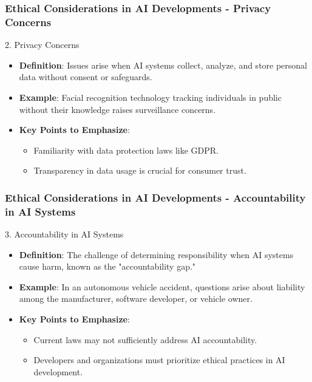 \documentclass[aspectratio=169]{beamer}
\begin{document}
\begin{frame}[fragile]
    \frametitle{Ethical Considerations in AI Developments - Privacy Concerns}
    
    \begin{block}{2. Privacy Concerns}
        \begin{itemize}
            \item \textbf{Definition}: Issues arise when AI systems collect, analyze, and store personal data without consent or safeguards.
            \item \textbf{Example}: Facial recognition technology tracking individuals in public without their knowledge raises surveillance concerns.
            \item \textbf{Key Points to Emphasize}:
            \begin{itemize}
                \item Familiarity with data protection laws like GDPR.
                \item Transparency in data usage is crucial for consumer trust.
            \end{itemize}
        \end{itemize}
    \end{block}
\end{frame}

\begin{frame}[fragile]
    \frametitle{Ethical Considerations in AI Developments - Accountability in AI Systems}
    
    \begin{block}{3. Accountability in AI Systems}
        \begin{itemize}
            \item \textbf{Definition}: The challenge of determining responsibility when AI systems cause harm, known as the "accountability gap."
            \item \textbf{Example}: In an autonomous vehicle accident, questions arise about liability among the manufacturer, software developer, or vehicle owner.
            \item \textbf{Key Points to Emphasize}:
            \begin{itemize}
                \item Current laws may not sufficiently address AI accountability.
                \item Developers and organizations must prioritize ethical practices in AI development.
            \end{itemize}
        \end{itemize}
    \end{block}
\end{frame}
\end{document}
